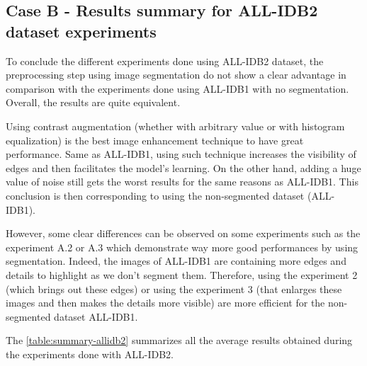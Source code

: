 \documentclass[11pt, openany]{report}
\theoremstyle{plain}
\theoremstyle{definition}
\theoremstyle{remark}
\begin{document}
\newpage
\subsection{Case B - Results summary for ALL-IDB2 dataset experiments}


\vspace{0.5cm}


To conclude the different experiments done using ALL-IDB2 dataset, the preprocessing step using image segmentation do not show a clear advantage in comparison with the experiments done using ALL-IDB1 with no segmentation. Overall, the results are quite equivalent. 

Using contrast augmentation (whether with arbitrary value or with histogram equalization) is the best image enhancement technique to have great performance. Same as ALL-IDB1, using such technique increases the visibility of edges and then facilitates the model's learning. On the other hand, adding a huge value of noise still gets the worst results for the same reasons as ALL-IDB1. This conclusion is then corresponding to using the non-segmented dataset (ALL-IDB1). 

However, some clear differences can be observed on some experiments such as the experiment A.2 or A.3 which demonstrate way more good performances by using segmentation. Indeed, the images of ALL-IDB1 are containing more edges and details to highlight as we don't segment them. Therefore, using the experiment 2 (which brings out these edges) or using the experiment 3 (that enlarges these images and then makes the details more visible) are more efficient for the non-segmented dataset ALL-IDB1. 

The \autoref{table:summary-allidb2} summarizes all the average results obtained during the experiments done with ALL-IDB2. 
\end{document}
